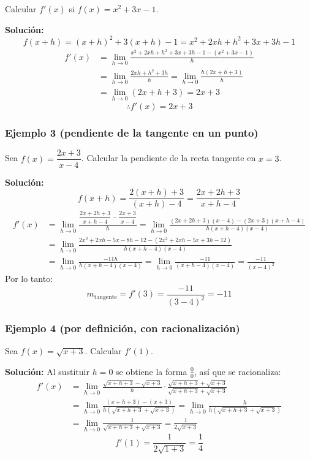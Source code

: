 \documentclass[12pt]{article}
\begin{document}
Calcular $f'(x)$ si $f(x) = x^2 + 3x - 1$.

\textbf{Solución:}
\[
f(x+h) = (x+h)^2 + 3(x+h) - 1 = x^2 + 2xh + h^2 + 3x + 3h - 1
\]
\begin{align*}
f'(x) &= \lim_{h \to 0} \frac{x^2 + 2xh + h^2 + 3x + 3h - 1 - (x^2 + 3x - 1)}{h} \\
&= \lim_{h \to 0} \frac{2xh + h^2 + 3h}{h} = \lim_{h \to 0} \frac{h(2x + h + 3)}{h} \\
&= \lim_{h \to 0} (2x + h + 3) = 2x + 3
\end{align*}
\[
\therefore f'(x) = 2x + 3
\]



\subsubsection{Ejemplo 3 (pendiente de la tangente en un punto)}


Sea $f(x) = \dfrac{2x+3}{x-4}$. Calcular la pendiente de la recta tangente en $x = 3$.

\textbf{Solución:}
\[
f(x+h) = \frac{2(x+h) + 3}{(x+h) - 4} = \frac{2x + 2h + 3}{x + h - 4}
\]
\begin{align*}
f'(x) &= \lim_{h \to 0} \frac{\dfrac{2x + 2h + 3}{x + h - 4} - \dfrac{2x + 3}{x - 4}}{h}
= \lim_{h \to 0} \frac{(2x + 2h + 3)(x - 4) - (2x + 3)(x + h - 4)}{h(x + h - 4)(x - 4)} \\
&= \lim_{h \to 0} \frac{2x^2 + 2xh - 5x - 8h - 12 - (2x^2 + 2xh - 5x + 3h - 12)}{h(x + h - 4)(x - 4)} \\
&= \lim_{h \to 0} \frac{-11h}{h(x + h - 4)(x - 4)} = \lim_{h \to 0} \frac{-11}{(x + h - 4)(x - 4)} = \frac{-11}{(x - 4)^2}
\end{align*}
Por lo tanto:
\[
m_{\text{tangente}} = f'(3) = \frac{-11}{(3 - 4)^2} = -11
\]



\subsubsection{Ejemplo 4 (por definición, con racionalización)}


Sea $f(x) = \sqrt{x+3}$. Calcular $f'(1)$.

\textbf{Solución:} Al sustituir $h = 0$ se obtiene la forma $\frac{0}{0}$, así que se racionaliza:
\begin{align*}
f'(x) &= \lim_{h \to 0} \frac{\sqrt{x + h + 3} - \sqrt{x + 3}}{h} \cdot \frac{\sqrt{x + h + 3} + \sqrt{x + 3}}{\sqrt{x + h + 3} + \sqrt{x + 3}} \\
&= \lim_{h \to 0} \frac{(x + h + 3) - (x + 3)}{h\left(\sqrt{x + h + 3} + \sqrt{x + 3}\right)}
= \lim_{h \to 0} \frac{h}{h\left(\sqrt{x + h + 3} + \sqrt{x + 3}\right)} \\
&= \lim_{h \to 0} \frac{1}{\sqrt{x + h + 3} + \sqrt{x + 3}} = \frac{1}{2\sqrt{x + 3}}
\end{align*}
\[
f'(1) = \frac{1}{2\sqrt{1 + 3}} = \frac{1}{4}
\]
\end{document}
